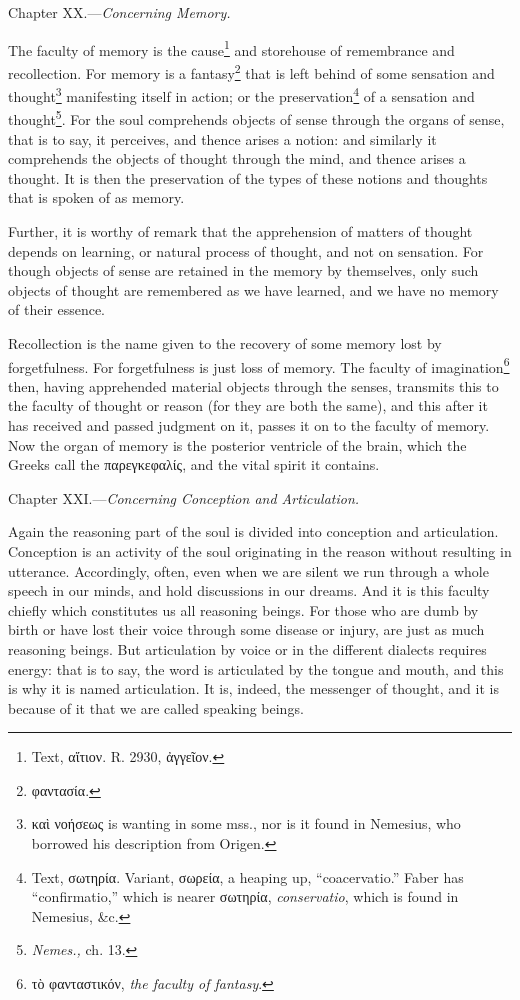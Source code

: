 
Chapter XX.—\emph{Concerning Memory.}

The faculty of memory is the cause\footnote{Text, \textgreek{αἴτιον}. R. 2930, \textgreek{ἀγγεῖον}.} and storehouse of remembrance and recollection. For memory is a fantasy\footnote{\textgreek{φαντασία}.} that is left behind of some sensation and thought\footnote{\textgreek{καὶ νοήσεως} is wanting in some mss., nor is it found in Nemesius, who borrowed his description from Origen.} manifesting itself in action; or the preservation\footnote{Text, \textgreek{σωτηρία}. Variant, \textgreek{σωρεία}, a heaping up, “coacervatio.” Faber has “confirmatio,” which is nearer \textgreek{σωτηρία}, \emph{conservatio}, which is found in Nemesius, \&c.} of a sensation and thought\footnote{\emph{Nemes.,} ch. 13.}. For the soul comprehends objects of sense through the organs of sense, that is to say, it perceives, and thence arises a notion: and similarly it comprehends the objects of thought through the mind, and thence arises a thought. It is then the preservation of the types of these notions and thoughts that is spoken of as memory.

Further, it is worthy of remark that the apprehension of matters of thought depends on learning, or natural process of thought, and not on sensation. For though objects of sense are retained in the memory by themselves, only such objects of thought are remembered as we have learned, and we have no memory of their essence.

Recollection is the name given to the recovery of some memory lost by forgetfulness. For forgetfulness is just loss of memory. The faculty of imagination\footnote{\textgreek{τὸ φανταστικόν}, \emph{the faculty of fantasy}.} then, having apprehended material objects through the senses, transmits this to the faculty of thought or reason (for they are both the same), and this after it has received and passed judgment on it, passes it on to the faculty of memory. Now the organ of memory is the posterior ventricle of the brain, which the Greeks call the \textgreek{παρεγκεφαλίς}, and the vital spirit it contains.


Chapter XXI.—\emph{Concerning Conception and Articulation.}

Again the reasoning part of the soul is divided into conception and articulation. Conception is an activity of the soul originating in the reason without resulting in utterance. Accordingly, often, even when we are silent we run through a whole speech in our minds, and hold discussions in our dreams. And it is this faculty chiefly which constitutes us all reasoning beings. For those who are dumb by birth or have lost their voice through some disease or injury, are just as much reasoning beings. But articulation by voice or in the different dialects requires energy: that is to say, the word is articulated by the tongue and mouth, and this is why it is named articulation. It is, indeed, the messenger of thought, and it is because of it that we are called speaking beings.

